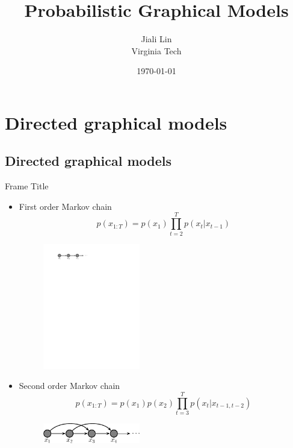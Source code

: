 \documentclass[10pt,mathserif]{beamer}
\title{\large \bfseries Probabilistic Graphical Models}
\author{Jiali Lin\\[3ex]
Virginia Tech}
\date{\today}
\begin{document}
\frame{
\thispagestyle{empty}
\titlepage
}

\section{Directed graphical models}
\subsection{Directed graphical models}
\begin{frame}{Frame Title}
\begin{itemize}
    \item First order Markov chain
    \begin{equation}
        p(x_{1:T}) = p(x_1)\prod_{t=2}^Tp(x_t |x_{t-1})
    \end{equation}
    \begin{figure}[h]
    \centering
    \includegraphics[width=0.4\textwidth]{markovChain1xCropped}
    \end{figure}

    \item Second order Markov chain
    \begin{equation}
        p(x_{1:T}) = p(x_1)p(x_2)\prod_{t=3}^Tp(x_t |x_{t-1,t-2})
    \end{equation}
    
    \begin{figure}[h]
    \centering
    \includegraphics[width=0.4\textwidth]{markovChain2}
    \end{figure}
\end{itemize}  
\end{frame}
\end{document}
